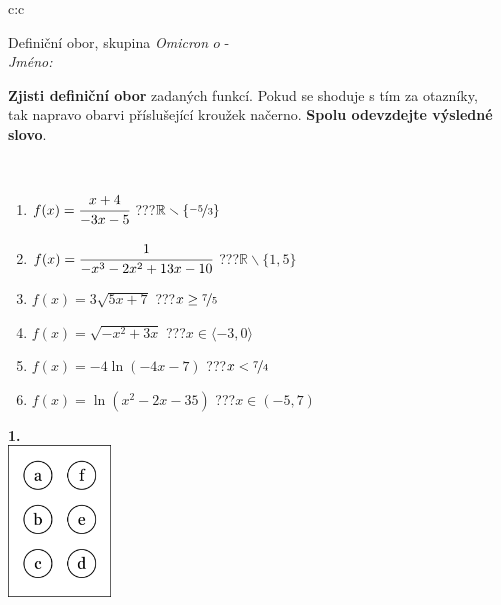 \documentclass[10pt]{report}
\newcommand\omicron{o}
\begin{document}
\begin{tabular}{c:c}
\begin{minipage}[c][104.5mm][t]{0.5\linewidth}
\begin{center}
\vspace{7mm}
{\huge Definiční obor, skupina \textit{Omicron $\omicron$} -}\\[5mm]
\textit{Jméno:}\phantom{xxxxxxxxxxxxxxxxxxxxxxxxxxxxxxxxxxxxxxxxxxxxxxxxxxxxxxxxxxxxxxxxx}\\[5mm]
\begin{minipage}{0.95\linewidth}
\begin{center}
\textbf{Zjisti definiční obor} zadaných funkcí. Pokud se shoduje s tím za otazníky,\\tak napravo obarvi příslušející kroužek načerno. \textbf{Spolu odevzdejte výsledné slovo}.
\end{center}
\end{minipage}
\\[1mm]
\begin{minipage}{0.79\linewidth}
\begin{center}
\begin{varwidth}{\linewidth}
\begin{enumerate}
\normalsizerrr
\item $f(x)=\cfrac{x+4}{-3x-5}$\quad \dotfill\; ???\;\dotfill \quad $\mathbb{R}\smallsetminus\{\nicefrac{-5}{3}\}$
\item $f(x)=\cfrac{1}{-x^3-2x^2+13x-10}$\quad \dotfill\; ???\;\dotfill \quad $\mathbb{R}\smallsetminus\{1,5\}$
\item $f(x)=3\sqrt{5x+7}$\quad \dotfill\; ???\;\dotfill \quad $x\geq\nicefrac{7}{5}$
\item $f(x)=\sqrt{-x^2+3x}$\quad \dotfill\; ???\;\dotfill \quad $x\in\langle-3 , 0\rangle$
\item $f(x)=-4\ln{(-4x-7)}$\quad \dotfill\; ???\;\dotfill \quad $x<\nicefrac{7}{4}$
\item $f(x)=\ln{(x^2-2x-35)}$\quad \dotfill\; ???\;\dotfill \quad $x\in(-5 , 7)$
\end{enumerate}
\end{varwidth}
\end{center}
\end{minipage}
\begin{minipage}{0.20\linewidth}
\begin{center}
{\Huge\bfseries 1.} \\[2mm]
\includegraphics[height=40mm]{../images/braille.png}

\end{center}
\end{minipage}
\end{center}
\end{minipage}
\end{tabular}
\end{document}

